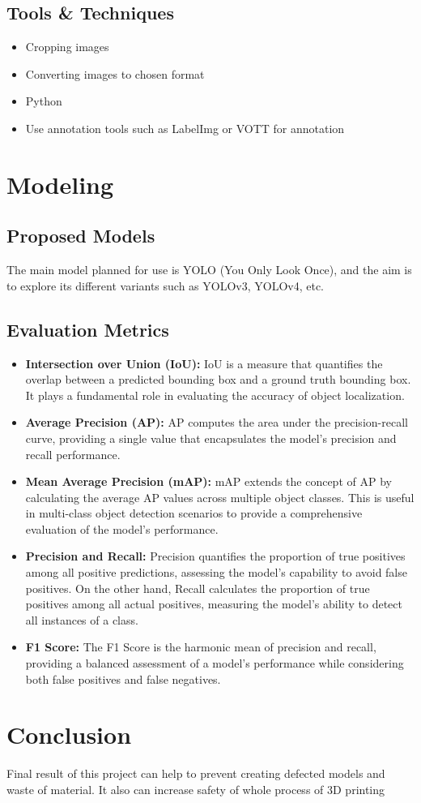 \documentclass[12pt,a4paper]{article}
\begin{document}
\subsection{Tools \& Techniques}
\begin{itemize}
    \item Cropping images
    \item Converting images to chosen format
    \item Python
    \item Use annotation tools such as LabelImg or VOTT for annotation
\end{itemize}

\section{Modeling}
\subsection{Proposed Models}
The main model planned for use is YOLO (You Only Look Once), and the aim is to explore its different variants such as YOLOv3, YOLOv4, etc.
\subsection{Evaluation Metrics}
\begin{itemize}
    \item \textbf{Intersection over Union (IoU):}  IoU is a measure that quantifies the overlap between a predicted bounding box and a ground truth bounding box. It plays a fundamental role in evaluating the accuracy of object localization.
    \item \textbf{Average Precision (AP):} AP computes the area under the precision-recall curve, providing a single value that encapsulates the model's precision and recall performance.
    \item \textbf{Mean Average Precision (mAP):} mAP extends the concept of AP by calculating the average AP values across multiple object classes. This is useful in multi-class object detection scenarios to provide a comprehensive evaluation of the model's performance.
    \item \textbf{Precision and Recall:} Precision quantifies the proportion of true positives among all positive predictions, assessing the model's capability to avoid false positives. On the other hand, Recall calculates the proportion of true positives among all actual positives, measuring the model's ability to detect all instances of a class.
    \item \textbf{F1 Score:} The F1 Score is the harmonic mean of precision and recall, providing a balanced assessment of a model's performance while considering both false positives and false negatives.
\end{itemize}

\section{Conclusion}

Final result of this project can help to prevent creating defected models and waste of material. It also can increase safety of whole process of 3D printing 
\end{document}
